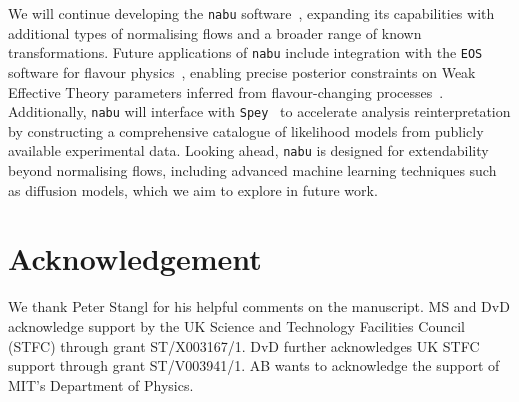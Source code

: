 \documentclass[aps,nofootinbib,superscriptaddress,reprint,preprintnumbers]{revtex4-1}
\newcommand{\nabu}{\texttt{nabu}\xspace}
\newcommand{\EOS}{\texttt{EOS}\xspace}
\newcommand{\spey}{\texttt{Spey}\xspace}
\begin{document}
We will continue developing the \nabu software~\cite{NABU:Software}, expanding its capabilities with additional types of normalising flows and a broader range of known transformations.
Future applications of \nabu include integration with the \EOS software for flavour physics~\cite{EOSAuthors:2021xpv}, enabling precise posterior constraints on Weak Effective Theory parameters inferred from flavour-changing processes~\cite{Leljak:2023gna,Bolognani:2024cmr,Meiser:2024zea}.
Additionally, \nabu will interface with \spey~\cite{Araz:2023bwx} to accelerate analysis reinterpretation by constructing a comprehensive catalogue of likelihood models from publicly available experimental data.
Looking ahead, \nabu is designed for extendability beyond normalising flows, including advanced machine learning techniques such as diffusion models, which we aim to explore in future work.

\section*{Acknowledgement}

We thank Peter Stangl for his helpful comments on the manuscript.
MS and DvD acknowledge support by the UK Science and Technology Facilities Council (STFC) through grant ST/X003167/1.
DvD further acknowledges UK STFC support through grant ST/V003941/1.
AB wants to acknowledge the support of MIT's Department of Physics.

\newpage

\end{document}

